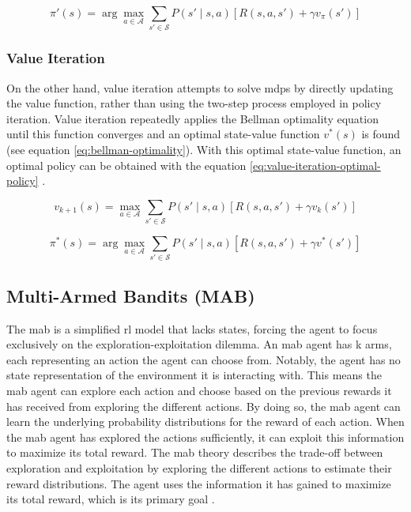 \begin{equation}\label{eq:policy-improvement}
\pi'(s) = \arg\max_{a \in \mathcal{A}} \sum_{s' \in \mathcal{S}} P(s' \mid s, a) \left[ R(s, a, s') + \gamma v_\pi(s') \right]
\end{equation}

\subsubsection{Value Iteration}
On the other hand, value iteration attempts to solve \glspl{mdp} by directly updating the value function, rather than using the two-step process employed in policy iteration.
Value iteration repeatedly applies the Bellman optimality equation until this function converges and an optimal state-value function $v^*(s)$ is found (see equation \ref{eq:bellman-optimality}).
With this optimal state-value function, an optimal policy can be obtained with the equation \ref{eq:value-iteration-optimal-policy} \cite{sutton_reinforcement_2018, zhang_dive_2023}.

\begin{equation}\label{eq:bellman-optimality}
    v_{k+1}(s) = \max_{a \in \mathcal{A}} \sum_{s' \in \mathcal{S}} P(s' \mid s, a) \left[ R(s, a, s') + \gamma v_k(s') \right]
\end{equation}

\begin{equation}\label{eq:value-iteration-optimal-policy}
\pi^*(s) = \arg\max_{a \in \mathcal{A}} \sum_{s' \in \mathcal{S}} P(s' \mid s, a) \left[ R(s, a, s') + \gamma v^*(s') \right]
\end{equation}

\subsection{Multi-Armed Bandits (MAB)}
The \gls{mab} is a simplified \gls{rl} model that lacks states, forcing the agent to focus exclusively on the exploration-exploitation dilemma.
An \gls{mab} agent has k arms, each representing an action the agent can choose from.
Notably, the agent has no state representation of the environment it is interacting with.
This means the \gls{mab} agent can explore each action and choose based on the previous rewards it has received from exploring the different actions.
By doing so, the \gls{mab} agent can learn the underlying probability distributions for the reward of each action.
When the \gls{mab} agent has explored the actions sufficiently, it can exploit this information to maximize its total reward.
The \gls{mab} theory describes the trade-off between exploration and exploitation by exploring the different actions to estimate their reward distributions.
The agent uses the information it has gained to maximize its total reward, which is its primary goal \cite{sutton_reinforcement_2018}.

